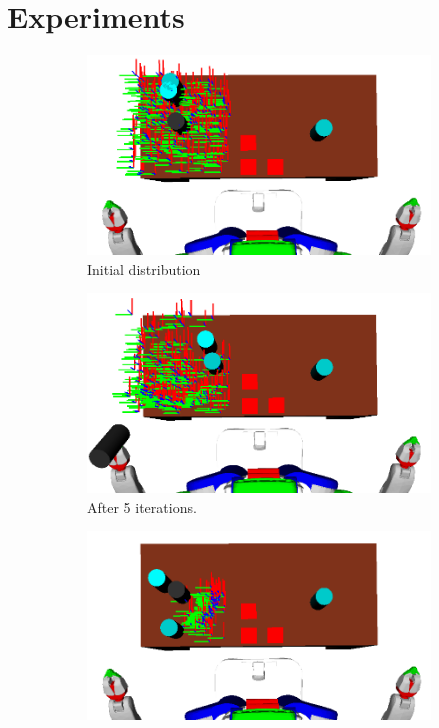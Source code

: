 \section{Experiments}
\begin{figure}
  \centering
  \begin{subfigure}[b]{0.48\linewidth}
    \includegraphics[width=\textwidth]{images/learngs.png}
    \caption{Initial distribution}
  \end{subfigure}
  \begin{subfigure}[b]{0.48\linewidth}
    \includegraphics[width=\textwidth]{images/learng5.png}
    \caption{After 5 iterations.}
  \end{subfigure}
  \begin{subfigure}[b]{0.48\linewidth}
    \includegraphics[width=\textwidth]{images/learng15.png}

\end{subfigure}
\end{figure}
